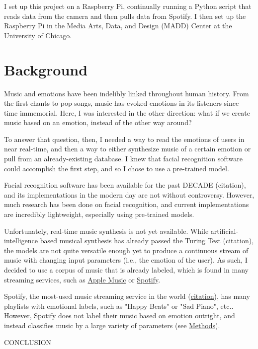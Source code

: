 \documentclass{article}
\renewcommand{\_}[1]{\underline{ #1 }}
\theoremstyle{definition}
\begin{document}
I set up this project on a Raspberry Pi, continually running a Python script that reads data from the camera and then pulls data from Spotify. I then set up the Raspberry Pi in the Media Arts, Data, and Design (MADD) Center at the University of Chicago. 


\section{Background}

Music and emotions have been indelibly linked throughout human history. From the first chants to pop songs, music has evoked emotions in its listeners since time immemorial. Here, I was interested in the other direction: what if we create music based on an emotion, instead of the other way around?

To answer that question, then, I needed a way to read the emotions of users in near real-time, and then a way to either synthesize music of a certain emotion or pull from an already-existing database. I knew that facial recognition software could accomplish the first step, and so I chose to use a pre-trained model.

Facial recognition software has been available for the past DECADE (citation), and its implementations in the modern day are not without controversy. However, much research has been done on facial recognition, and current implementations are incredibly lightweight, especially using pre-trained models. 

Unfortunately, real-time music synthesis is not yet available. While artificial-intelligence based musical synthesis has already passed the Turing Test (citation), the models are not quite versatile enough yet to produce a continuous stream of music with changing input parameters (i.e., the emotion of the user). As such, I decided to use a corpus of music that is already labeled, which is found in many streaming services, such as \href{https://www.apple.com/apple-music/}{Apple Music} or \href{https://www.spotify.com/us/}{Spotify}.

Spotify, the most-used music streaming service in the world (\href{https://www.midiaresearch.com/blog/music-subscriber-market-shares-q2-2021}{citation}), has many playlists with emotional labels, such as "Happy Beats" or "Sad Piano", etc.. However, Spotify does not label their music based on emotion outright, and instead classifies music by a large variety of parameters (see \hyperref[Methods]{Methods}). 

CONCLUSION
\end{document}

